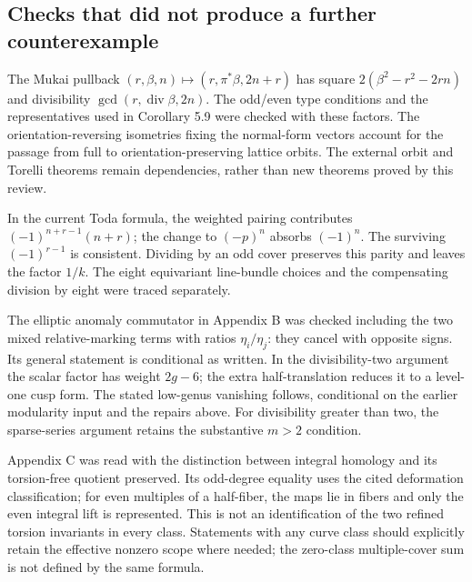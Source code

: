 \documentclass[10pt]{article}
\begin{document}
\subsection*{Checks that did not produce a further counterexample}
The Mukai pullback \((r,\beta,n)\mapsto(r,\pi^*\beta,2n+r)\) has square \(2(\beta^2-r^2-2rn)\) and divisibility \(\gcd(r,\operatorname{div}\beta,2n)\). The odd/even type conditions and the representatives used in Corollary 5.9 were checked with these factors. The orientation-reversing isometries fixing the normal-form vectors account for the passage from full to orientation-preserving lattice orbits. The external orbit and Torelli theorems remain dependencies, rather than new theorems proved by this review.\par
In the current Toda formula, the weighted pairing contributes \((-1)^{n+r-1}(n+r)\); the change to \((-p)^n\) absorbs \((-1)^n\). The surviving \((-1)^{r-1}\) is consistent. Dividing by an odd cover preserves this parity and leaves the factor \(1/k\). The eight equivariant line-bundle choices and the compensating division by eight were traced separately.\par
The elliptic anomaly commutator in Appendix B was checked including the two mixed relative-marking terms with ratios \(\eta_i/\eta_j\): they cancel with opposite signs. Its general statement is conditional as written. In the divisibility-two argument the scalar factor has weight \(2g-6\); the extra half-translation reduces it to a level-one cusp form. The stated low-genus vanishing follows, conditional on the earlier modularity input and the repairs above. For divisibility greater than two, the sparse-series argument retains the substantive \(m>2\) condition.\par
Appendix C was read with the distinction between integral homology and its torsion-free quotient preserved. Its odd-degree equality uses the cited deformation classification; for even multiples of a half-fiber, the maps lie in fibers and only the even integral lift is represented. This is not an identification of the two refined torsion invariants in every class. Statements with any curve class should explicitly retain the effective nonzero scope where needed; the zero-class multiple-cover sum is not defined by the same formula.\par
\end{document}

